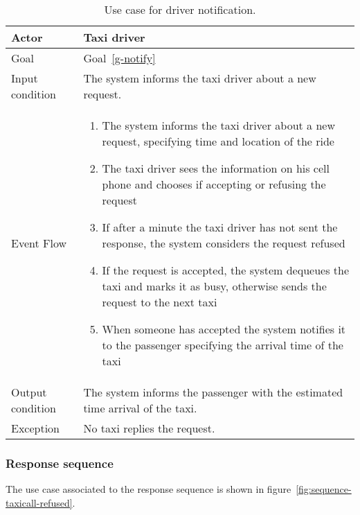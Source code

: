 \begin{table}
\begin{center}
\begin{tabular}{| l | p{} |}
\hline
Actor & Taxi driver \\
\hline
Goal & Goal~\ref{g-notify}
\\
\hline
Input condition & The system informs the taxi driver about a new request.  \\
\hline
Event Flow & \begin{enumerate}
	\item The system informs the taxi driver about a new request, specifying time and location of the ride
	\item The taxi driver sees the information on his cell phone and chooses if accepting or refusing the request
	\item If after a minute the taxi driver has not sent the response, the system considers the request refused
	\item If the request is accepted,  the system dequeues the taxi and marks it as busy, otherwise sends the request to the next taxi
	\item When someone has accepted the system notifies it to the passenger specifying the arrival time of the taxi
	\end{enumerate}
\\
\hline
Output condition & The system informs the passenger with the estimated time arrival of the taxi. \\
\hline
Exception & No taxi replies the request. \\
\hline
\end{tabular}
\end{center}
\caption{Use case for driver notification.}
\label{usecase-drivernotification}
\end{table}

\subsubsection{Response sequence}
The use case associated to the response sequence is shown in figure~\ref{fig:sequence-taxicall-refused}.

